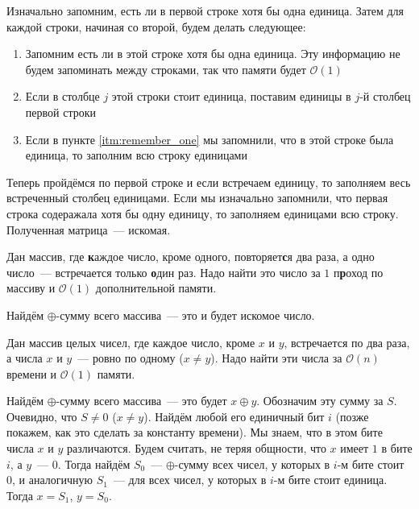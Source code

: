 \documentclass[addpoints]{exam}
\begin{document}
\begin{questions}
\begin{solution}
Изначально запомним, есть ли в первой строке хотя бы одна единица. Затем для каждой строки, начиная со второй, будем делать следующее:

\begin{enumerate}

\item \label{itm:remember_one} Запомним есть ли в этой строке хотя бы одна единица. Эту информацию не будем запоминать между строками, так что памяти будет $\mathcal{O}(1)$

\item Если в столбце $j$ этой строки стоит единица, поставим единицы в $j$-й столбец первой строки

\item Если в пункте \ref{itm:remember_one} мы запомнили, что в этой строке была единица, то заполним всю строку единицами

\end{enumerate}

Теперь пройдёмся по первой строке и если встречаем единицу, то заполняем весь встреченный столбец единицами. Если мы изначально запомнили, что первая строка содеражала хотя бы одну единицу, то заполняем единицами всю строку. Полученная матрица~--- искомая.

\end{solution}

\question[\half] Дан массив, где \textbf{к}аждое число, кроме одного, повторяет\textbf{с}я два раза, а одно число~--- встречается только \textbf{о}дин раз. Надо найти это число за $1$ п\textbf{р}оход по массиву и $\mathcal{O}(1)$ дополнительной памяти.

\begin{solution}

Найдём $\oplus$-сумму всего массива~--- это и будет искомое число.

\end{solution}

\question[1 \half] Дан массив целых чисел, где каждое число, кроме $x$ и $y$, встречается по два раза, а числа $x$ и $y$~--- ровно по одному ($x \neq y$). Надо найти эти числа за $\mathcal{O}(n)$ времени и $\mathcal{O}(1)$ памяти.

\begin{solution}

Найдём $\oplus$-сумму всего массива~--- это будет $x \oplus y$. Обозначим эту сумму за $S$. Очевидно, что $S \neq 0$ ($x \neq y$). Найдём любой его единичный бит $i$ (позже покажем, как это сделать за константу времени). Мы знаем, что в этом бите числа $x$ и $y$ различаются. Будем считать, не теряя общности, что $x$ имеет $1$ в бите $i$, а $y$~--- $0$. Тогда найдём $S_0$~--- $\oplus$-сумму всех чисел, у которых в $i$-м бите стоит $0$, и аналогичную $S_1$~--- для всех чисел, у которых в $i$-м бите стоит единица. Тогда $x = S_1$, $y = S_0$. 


\end{solution}
\end{questions}
\end{document}
